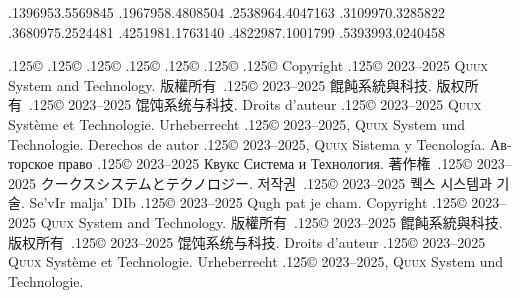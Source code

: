 \documentclass{cookbook}
\begin{document}
{{{	.1396953\textwidth .5569845\textwidth%
	.1967958\textwidth .4808504\textwidth
	.2538964\textwidth .4047163\textwidth
	.3109970\textwidth .3285822\textwidth
	.3680975\textwidth .2524481\textwidth
	.4251981\textwidth .1763140\textwidth%
	.4822987\textwidth .1001799\textwidth%
	.5393993\textwidth .0240458\textwidth%
\rule{0pt}{0pt}%
{\lower.125\baselineskip\hbox{\copyright}}
{\lower.125\baselineskip\hbox{\copyright}}
{\lower.125\baselineskip\hbox{\copyright}}
{\lower.125\baselineskip\hbox{\copyright}}
{\lower.125\baselineskip\hbox{\copyright}}
\hspace{.25em plus 1em}%
\texttt{{\gitabbrcommithash}}
{\lower.125\baselineskip\hbox{\copyright}}
{\lower.125\baselineskip\hbox{\copyright}}
Copyright {\lower.125\baselineskip\hbox{\copyright}}
	2023--2025 \textsc{Quux} System and Technology.
版權所有~{\lower.125\baselineskip\hbox{\copyright}}
	2023--2025 餛飩系統與科技.
版权所有~{\lower.125\baselineskip\hbox{\copyright}}
	2023--2025 馄饨系统与科技.
Droits d'auteur {\lower.125\baselineskip\hbox{\copyright}} %
	2023--2025 \textsc{Quux} Système et Technologie.
Urheberrecht {\lower.125\baselineskip\hbox{\copyright}} %
	2023--2025, \textsc{Quux} System und Technologie.
Derechos de autor {\lower.125\baselineskip\hbox{\copyright}} %
	2023--2025, \textsc{Quux} Sistema y Tecnología.
\foreignlanguage{russian}{Авторское право} %
	{\lower.125\baselineskip\hbox{\copyright}}
	2023–2025 \foreignlanguage{russian}{Квукс Система и Технология.}
著作権~{\lower.125\baselineskip\hbox{\copyright}}
	2023--2025 クークスシステムとテクノロジー.
저작권~{\lower.125\baselineskip\hbox{\copyright}}
	2023--2025 퀙스 시스템과 기술.
Se'vIr malja' DIb {\lower.125\baselineskip\hbox{\copyright}} %
	2023--2025 Qugh pat je cham.
\texttt{{\gitabbrcommithash}}
Copyright {\lower.125\baselineskip\hbox{\copyright}}
	2023--2025 \textsc{Quux} System and Technology.
版權所有~{\lower.125\baselineskip\hbox{\copyright}}
	2023--2025 餛飩系統與科技.
版权所有~{\lower.125\baselineskip\hbox{\copyright}}
	2023--2025 馄饨系统与科技.
Droits d'auteur {\lower.125\baselineskip\hbox{\copyright}} %
	2023--2025 \textsc{Quux} Système et Technologie.
Urheberrecht {\lower.125\baselineskip\hbox{\copyright}} %
	2023--2025, \textsc{Quux} System und Technologie.
}}}
\end{document}
